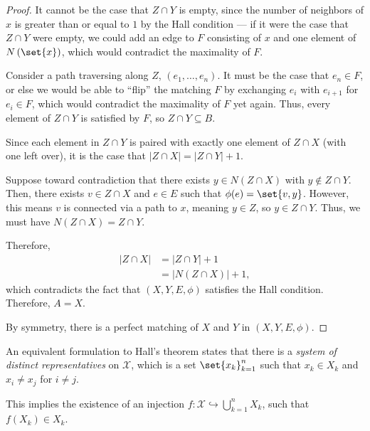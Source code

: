 \begin{proof}
  It cannot be the case that $Z\cap Y$ is empty, since the number of neighbors of $x$ is greater than or equal to $1$ by the Hall condition --- if it were the case that $Z\cap Y$ were empty, we could add an edge to $F$ consisting of $x$ and one element of $N\left(\set{x}\right)$, which would contradict the maximality of $F$.\newline

  Consider a path traversing along $Z$, $\left(e_1,\dots,e_n\right)$. It must be the case that $e_n\in F$, or else we would be able to ``flip'' the matching $F$ by exchanging $e_{i}$ with $e_{i+1}$ for $e_i\in F$, which would contradict the maximality of $F$ yet again. Thus, every element of $Z\cap Y$ is satisfied by $F$, so $Z\cap Y\subseteq B$.\newline

  Since each element in $Z\cap Y$ is paired with exactly one element of $Z\cap X$ (with one left over), it is the case that $\left\vert Z\cap X \right\vert = \left\vert Z\cap Y \right\vert + 1$.\newline

  Suppose toward contradiction that there exists $y\in N\left(Z\cap X\right)$ with $y\notin Z\cap Y$. Then, there exists $v\in Z\cap X$ and $e\in E$ such that $\phi(e) = \set{v,y}$. However, this means $v$ is connected via a path to $x$, meaning $y\in Z$, so $y\in Z\cap Y$. Thus, we must have $N\left(Z\cap X\right) = Z\cap Y$.\newline

  Therefore,
  \begin{align*}
    \left\vert Z\cap X \right\vert &= \left\vert Z\cap Y \right\vert + 1\\
                                   &= \left\vert N\left(Z\cap X\right) \right\vert + 1,
  \end{align*}
  which contradicts the fact that $\left(X,Y,E,\phi\right)$ satisfies the Hall condition. Therefore, $A = X$.\newline

  By symmetry, there is a perfect matching of $X$ and $Y$ in $\left(X,Y,E,\phi\right)$.
\end{proof}
\begin{remark}
  An equivalent formulation to Hall's theorem states that there is a \textit{system of distinct representatives} on $\mathcal{X}$, which is a set $\set{x_{k}}_{k=1}^{n}$ such that $x_{k}\in X_{k}$ and $x_{i}\neq x_j$ for $i\neq j$.\newline

  This implies the existence of an injection $f: \mathcal{X}\hookrightarrow \bigcup_{k=1}^{n}X_{k}$, such that $f\left(X_k\right) \in X_k$.
\end{remark}

